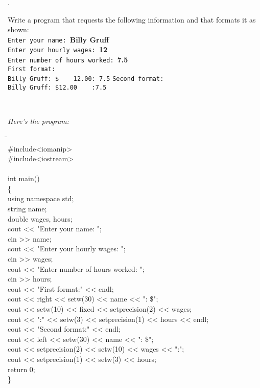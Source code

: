 \documentclass{amsart}
\begin{document}
\phantom{\quad}
\vfill
{}. 
\begin{minipage}[t]{11.5 cm}
	Write a program that requests the following information and that formats it as shown: \\
\verb+Enter your name: +\textbf{Billy Gruff}\\
\verb+Enter your hourly wages: +\textbf{12}\\
\verb+Enter number of hours worked: +\textbf{7.5}\\
\verb+First format:+ \\
\verb+Billy Gruff: $    12.00: 7.5+
\verb+Second format:+\\
\verb+Billy Gruff+\verb+: $12.00    :7.5+
\\[1ex]
\end{minipage} \\[1ex]
\phantom{2. } 
\begin{minipage}[t]{11.5 cm}
	{\slshape Here's the program:}
	{\ttfamily
		\begin{tabbing}
			\phantom{\qquad}\=\phantom{\qquad}\=\phantom{\qquad}\= \\
			\#include<iomanip> \\
			\#include<iostream> \\
			\\
			int main() \\
			\{
			\+ \\
				using namespace std; \\
				string name; \\
				double wages, hours; \\
				cout << "Enter your name: "; \\
				cin >> name; \\
				cout << "Enter your hourly wages: "; \\
				cin >> wages; \\
				cout << "Enter number of hours worked: "; \\
				cin >> hours; \\
				cout << "First format:" << endl; \\
				cout << right << setw(30) << name << ": \$"; \\
				cout << setw(10) << fixed << setprecision(2) << wages; \\
				cout << ":" << setw(3) << setprecision(1) << hours << endl; \\
				cout << "Second format:" << endl; \\
				cout << left << setw(30) << name << ": \$"; \\
				cout << setprecision(2) << setw(10) << wages << ":"; \\
				cout << setprecision(1) << setw(3) << hours; \\
				return 0; \\
			\< \}
		\end{tabbing}
	}
 
\end{minipage} 
\vfill
\newpage
\end{document}
